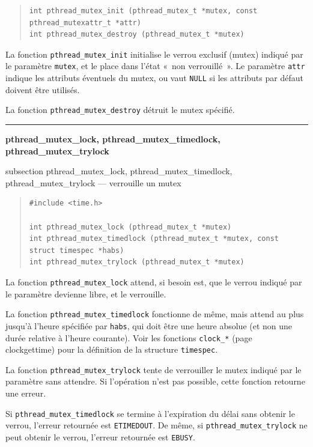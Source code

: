 \documentclass [twoside] {report}
\newcommand {\primitive} [1]
    {
	\phantomsection
	{\large \textbf {#1}}
	\addcontentsline {toc} {subsection} {#1}
    }
\newcommand {\separation}
    {
	\vspace {5mm}
	\nopagebreak
	\hrule
    }
\begin{document}
\begin {quote}
\begin {verbatim}
int pthread_mutex_init (pthread_mutex_t *mutex, const pthread_mutexattr_t *attr)
int pthread_mutex_destroy (pthread_mutex_t *mutex)
\end{verbatim}
\end {quote}

La fonction \verb|pthread_mutex_init| initialise le verrou exclusif
(mutex) indiqué par le paramètre \texttt {mutex}, et le place dans
l'état «~non verrouillé~». Le paramètre \texttt {attr} indique les
attributs éventuels du mutex, ou vaut \texttt {NULL} si les attributs
par défaut doivent être utilisés.

La fonction \verb|pthread_mutex_destroy| détruit le mutex spécifié.


\separation
\primitive {pthread\_mutex\_lock, pthread\_mutex\_timedlock, pthread\_mutex\_trylock} --- verrouille un mutex
    \label {pthreadmutextimedlock}

\begin {quote}
\begin {verbatim}
#include <time.h>

int pthread_mutex_lock (pthread_mutex_t *mutex)
int pthread_mutex_timedlock (pthread_mutex_t *mutex, const struct timespec *habs)
int pthread_mutex_trylock (pthread_mutex_t *mutex)
\end{verbatim}
\end {quote}

La fonction \verb|pthread_mutex_lock| attend, si besoin est, que le
verrou indiqué par le paramètre devienne libre, et le verrouille.

La fonction \verb|pthread_mutex_timedlock| fonctionne de même, mais
attend au plus jusqu'à l'heure spécifiée par \texttt {habs}, qui
doit être une heure absolue (et non une durée relative à l'heure
courante). Voir les fonctions \texttt {clock\_*} (page~\pageref
{clockgettime}) pour la définition de la structure \texttt {timespec}.

La fonction \verb|pthread_mutex_trylock| tente de verrouiller le mutex
indiqué par le paramètre sans attendre. Si l'opération n'est pas
possible, cette fonction retourne une erreur.

Si \verb|pthread_mutex_timedlock| se termine à l'expiration du délai
sans obtenir le verrou, l'erreur retournée est \texttt {ETIMEDOUT}.
De même, si \verb|pthread_mutex_trylock| ne peut obtenir le verrou,
l'erreur retournée est \texttt {EBUSY}.
\end{document}
